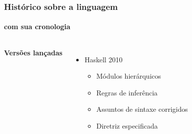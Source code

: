 \begin{frame}

    \frametitle{Histórico sobre a linguagem}
    \framesubtitle{com sua cronologia}

    \begin{columns}
      \textbf{Versões lançadas} 

      \begin{itemize}
        \item Haskell 2010 
        
        \begin{itemize}
          \item Módulos hierárquicos
          \item Regras de inferência
          \item Assuntos de sintaxe corrigidos
          \item Diretriz especificada     
        \end{itemize}

      \end{itemize}


    \end{columns}

\end{frame}